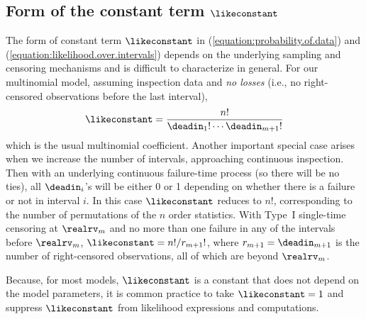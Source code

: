 \subsection{Form of the constant term $\likeconstant$}
\label{section:form.of.constant}
The form of constant term $\likeconstant$ in 
(\ref{equation:probability.of.data}) and 
(\ref{equation:likelihood.over.intervals})
depends on the underlying
sampling and censoring mechanisms and is difficult to
characterize in general. For our multinomial model,
assuming inspection data and {\em no losses} (i.e., no 
right-censored observations before the last interval),
 \begin{displaymath}
	\likeconstant=\frac{n!}{\deadin_{1}! \cdots \deadin_{m+1}!}
 \end{displaymath}
which is the usual multinomial coefficient.
Another important special case arises
when we increase the number of intervals,
approaching continuous inspection. Then with an underlying continuous
failure-time process (so there will be no ties), all
$\deadin_{i}$'s will be either 0 or 1 depending on whether
there is a failure or not in interval $i$.
In this case $\likeconstant$ reduces to $n!$,
corresponding to the number of permutations of the $n$ order
statistics.
With Type~I single-time censoring at
$\realrv_{m}$ and no more than one failure in any 
of the intervals before $\realrv_{m}$, $\likeconstant=n!/r_{m+1}!$,
where $r_{m+1}=\deadin_{m+1}$ is the number of right-censored
observations, all of which are beyond $\realrv_{m}$.

Because, for most models, $\likeconstant$ is a constant 
that does not depend on the model parameters, it is common
practice to take $\likeconstant=1$ and suppress 
$\likeconstant$ from likelihood expressions and computations.

